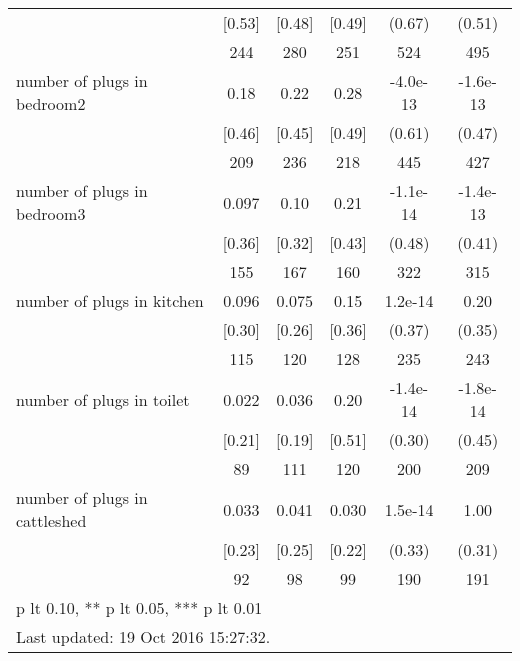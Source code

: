 \begin{table}[htbp]
\begin{tabular*}{0.9\hsize}{@{\hskip\tabcolsep\extracolsep\fill}l*{1}{ccccc}}
                                &   [0.53]&   [0.48]&   [0.49]&   (0.67)         &   (0.51)         \\
                                &      244&      280&      251&      524         &      495         \\
number of plugs in bedroom2     &     0.18&     0.22&     0.28& -4.0e-13         & -1.6e-13         \\
                                &   [0.46]&   [0.45]&   [0.49]&   (0.61)         &   (0.47)         \\
                                &      209&      236&      218&      445         &      427         \\
number of plugs in bedroom3     &    0.097&     0.10&     0.21& -1.1e-14         & -1.4e-13         \\
                                &   [0.36]&   [0.32]&   [0.43]&   (0.48)         &   (0.41)         \\
                                &      155&      167&      160&      322         &      315         \\
number of plugs in kitchen      &    0.096&    0.075&     0.15&  1.2e-14         &     0.20         \\
                                &   [0.30]&   [0.26]&   [0.36]&   (0.37)         &   (0.35)         \\
                                &      115&      120&      128&      235         &      243         \\
number of plugs in toilet       &    0.022&    0.036&     0.20& -1.4e-14         & -1.8e-14         \\
                                &   [0.21]&   [0.19]&   [0.51]&   (0.30)         &   (0.45)         \\
                                &       89&      111&      120&      200         &      209         \\
number of plugs in cattleshed   &    0.033&    0.041&    0.030&  1.5e-14         &     1.00\sym{***}\\
                                &   [0.23]&   [0.25]&   [0.22]&   (0.33)         &   (0.31)         \\
                                &       92&       98&       99&      190         &      191         \\
\bottomrule
\multicolumn{6}{l}{\footnotesize * p lt 0.10, ** p lt 0.05, *** p lt 0.01}\\
\multicolumn{6}{l}{\footnotesize Last updated: 19 Oct 2016 15:27:32.}\\
\end{tabular*}
\end{table}
